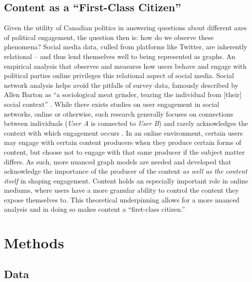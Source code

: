 \subsection{Content as a ``First-Class Citizen''}

Given the utility of Canadian politics in answering questions about different
axes of political engagement, the question then is: how do we observe these
phenomena? Social media data, culled from platforms like Twitter, are inherently
relational -- and thus lend themselves well to being represented as graphs. An
empirical analysis that observes and measures how users behave and engage with
political parties online privileges this relational aspect of social media.
Social network analysis helps avoid the pitfalls of survey data, famously
described by Allen Barton as “a sociological meat grinder, tearing the
individual from [their] social context” \cite{freeman2004development}. While
there exists studies on user engagement in social networks, online or otherwise,
such research generally focuses on connections between individuals (\emph{User
A} is connected to \emph{User B}) and rarely acknowledges the context with which
engagement occurs \cite{Zhang2017FindingCU,kavanaugh2002community}. In an online
environment, certain users may engage with certain content producers when they
produce certain forms of content, but choose not to engage with that same
producer if the subject matter differs. As such, more nuanced graph models are
needed and developed that acknowledge the importance of the producer of the
content \emph{as well as the content itself} in shaping engagement. Content
holds an especially important role in online mediums, where users have a more
granular ability to control the content they expose themselves to. This
theoretical underpinning allows for a more nuanced analysis and in doing so
makes content a ``first-class citizen.''


\section{Methods}

\subsection{Data}

